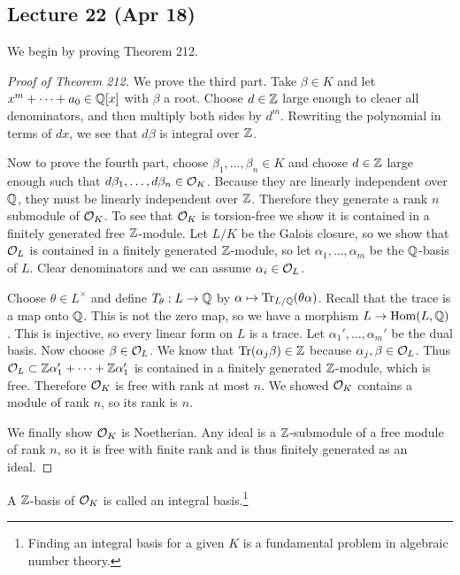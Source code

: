 \message{ !name(notes.tex)}\documentclass[10pt, twoside]{article}
\begin{document}
        \subsection{Lecture 22 (Apr 18)}
        We begin by proving Theorem 212.
        \begin{proof}[Proof of Theorem 212]
            We prove the third part. Take $\beta \in K$ and let $x^m + \cdots + a_0 \in \mathbb{Q}[x]$ with $\beta$ a root. Choose $d \in \mathbb{Z}$ large enough to cleaer all denominators, and then multiply both sides by $d^m$. Rewriting the polynomial in terms of $dx$, we see that $d\beta$ is integral over $\mathbb{Z}$.

            Now to prove the fourth part, choose $\beta_1, \ldots, \beta_n \in K$ and choose $d \in \mathbb{Z}$ large enough such that $d\beta_1, \ldots, d \beta_n \in \mathcal{O}_K$. Because they are linearly independent over $\mathbb{Q}$, they must be linearly independent over $\mathbb{Z}$. Therefore they generate a rank $n$ submodule of $\mathcal{O}_K$. To see that $\mathcal{O}_K$ is torsion-free we show it is contained in a finitely generated free $\mathbb{Z}$-module. Let $L/K$ be the Galois closure, so we show that $\mathcal{O}_L$ is contained in a finitely generated $\mathbb{Z}$-module, so let $\alpha_1, \ldots, \alpha_m$ be the $\mathbb{Q}$-basis of $L$. Clear denominators and we can assume $\alpha_i \in \mathcal{O}_L$. 
            
            Choose $\theta \in L^{\times}$ and define $T_{\theta}:L \to \mathbb{Q}$ by $\alpha \mapsto \mathrm{Tr}_{L/\mathbb{Q}}(\theta \alpha)$. Recall that the trace is a map onto $\mathbb{Q}$. This is not the zero map, so we have a morphism $L \to \operatorname{Hom}(L,\mathbb{Q})$. This is injective, so every linear form on $L$ is a trace. Let $\alpha_1', \ldots, \alpha_m'$ be the dual basis. Now choose $\beta \in \mathcal{O}_L$. We know that $\mathrm{Tr}(\alpha_j\beta) \in \mathbb{Z}$ because $\alpha_j, \beta \in \mathcal{O}_L$. Thus $\mathcal{O}_L \subset \mathbb{Z} \alpha_1' + \cdots + \mathbb{Z} \alpha_1'$ is contained in a finitely generated $\mathbb{Z}$-module, which is free. Therefore $\mathcal{O}_K$ is free with rank at most $n$. We showed $\mathcal{O}_K$ contains a module of rank $n$, so its rank is $n$.

            We finally show $\mathcal{O}_K$ is Noetherian. Any ideal is a $\mathbb{Z}$-submodule of a free module of rank $n$, so it is free with finite rank and is thus finitely generated as an ideal.
        \end{proof}

        \begin{defn}
            A $\mathbb{Z}$-basis of $\mathcal{O}_K$ is called an integral basis.\footnote{Finding an integral basis for a given $K$ is a fundamental problem in algebraic number theory.}
        \end{defn}
        
\end{document}
